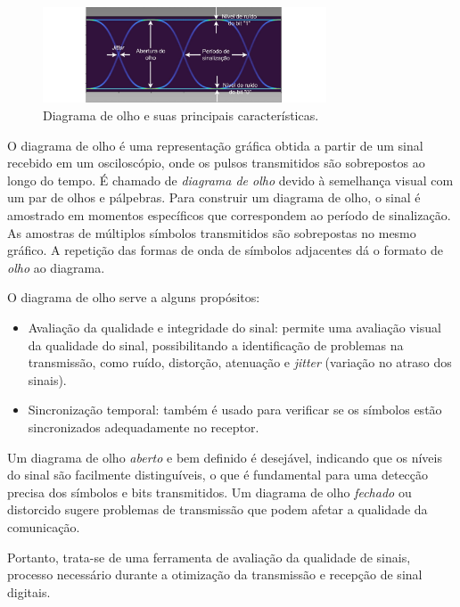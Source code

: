 \documentclass[12pt,addpoints]{exam}
\begin{document}
\begin{figure}[h]
        \centering
        \includegraphics[width=0.75\textwidth]{Figuras/EyeDiagram.png}
        \caption{Diagrama de olho e suas principais características.}
        \label{fig:eye}
\end{figure}

O diagrama de olho é uma representação gráfica obtida a partir de um sinal recebido em um osciloscópio, onde os pulsos transmitidos são sobrepostos ao longo do tempo. É chamado de \textit{diagrama de olho} devido à semelhança visual com um par de olhos e pálpebras. Para construir um diagrama de olho, o sinal é amostrado em momentos específicos que correspondem ao período de sinalização. As amostras de múltiplos símbolos transmitidos são sobrepostas no mesmo gráfico. A repetição das formas de onda de símbolos adjacentes dá o formato de \textit{olho} ao diagrama.

O diagrama de olho serve a alguns propósitos:

\begin{itemize}
\item Avaliação da qualidade e integridade do sinal: permite uma avaliação visual da qualidade do sinal, possibilitando a identificação de problemas na transmissão, como ruído, distorção, atenuação e \textit{jitter} (variação no atraso dos sinais).

\item Sincronização temporal: também é usado para verificar se os símbolos estão sincronizados adequadamente no receptor.
\end{itemize}

Um diagrama de olho \textit{aberto} e bem definido é desejável, indicando que os níveis do sinal são facilmente distinguíveis, o que é fundamental para uma detecção precisa dos símbolos e bits transmitidos. Um diagrama de olho \textit{fechado} ou distorcido sugere problemas de transmissão que podem afetar a qualidade da comunicação.

Portanto, trata-se de uma ferramenta de avaliação da qualidade de sinais, processo necessário durante a otimização da transmissão e recepção de sinal digitais.
\end{document}

